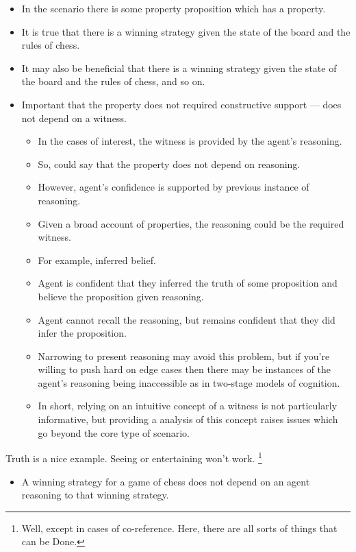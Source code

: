 \documentclass[10pt]{article}
\begin{document}
\begin{itemize}
\item In the scenario there is some property proposition which has a property.
\item It is true that there is a winning strategy given the state of the board and the rules of chess.
\item It may also be beneficial that there is a winning strategy given the state of the board and the rules of chess, and so on.
\item Important that the property does not required constructive support --- does not depend on a witness.
  \begin{itemize}
  \item In the cases of interest, the witness is provided by the agent's reasoning.
  \item So, could say that the property does not depend on reasoning.
  \item However, agent's confidence is supported by previous instance of reasoning.
  \item Given a broad account of properties, the reasoning could be the required witness.
  \item For example, inferred belief.
  \item Agent is confident that they inferred the truth of some proposition and believe the proposition given reasoning.
  \item Agent cannot recall the reasoning, but remains confident that they did infer the proposition.
  \item Narrowing to present reasoning may avoid this problem, but if you're willing to push hard on edge cases then there may be instances of the agent's reasoning being inaccessible as in two-stage models of cognition.
  \item In short, relying on an intuitive concept of a witness is not particularly informative, but providing a analysis of this concept raises issues which go beyond the core type of scenario.
  \end{itemize}
\end{itemize}
Truth is a nice example.
Seeing or entertaining won't work.\nolinebreak
\footnote{
  Well, except in cases of co-reference.
  Here, there are all sorts of things that can be Done.
}
\begin{itemize}
\item A winning strategy for a game of chess does not depend on an agent reasoning to that winning strategy.
\end{itemize}
\end{document}
